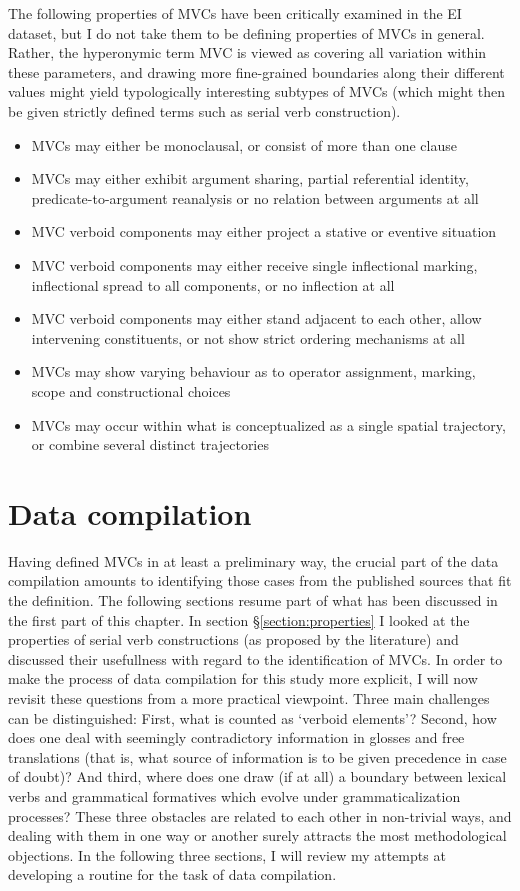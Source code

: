 The following properties of MVCs have been critically examined in the EI dataset, but I do not take them to be defining properties of MVCs in general. Rather, the hyperonymic term MVC is viewed as covering all variation within these parameters, and drawing more fine-grained boundaries along their different values might yield typologically interesting subtypes of MVCs (which might then be given strictly defined terms such as serial verb construction).


\begin{itemize}
\item MVCs may either be monoclausal, or consist of more than one clause
\item MVCs may either exhibit argument sharing, partial referential identity, predicate-to-argument reanalysis or no relation between arguments at all
\item MVC verboid components may either project a stative or eventive situation
\item MVC verboid components may either receive single inflectional marking, inflectional spread to all components, or no inflection at all
\item MVC verboid components may either stand adjacent to each other, allow intervening constituents, or not show strict ordering mechanisms at all
\item MVCs may show varying behaviour as to operator assignment, marking, scope and constructional choices
\item MVCs may occur within what is conceptualized as a single spatial trajectory, or combine several distinct trajectories 
\end{itemize}


\section{Data compilation}

Having defined MVCs in at least a preliminary way, the crucial part of the data compilation amounts to identifying those cases from the published sources that fit the definition. The following sections resume part of what has been discussed in the first part of this chapter. In section §\ref{section:properties} I looked at the properties of serial verb constructions (as proposed by the literature) and discussed their usefullness with regard to the identification of MVCs. In order to make the process of data compilation for this study more explicit, I will now revisit these questions from a more practical viewpoint.
Three main challenges can be distinguished: First, what is counted as `verboid elements'? Second, how does one deal with seemingly contradictory information in glosses and free translations (that is, what source of information is to be given precedence in case of doubt)? And third, where does one draw (if at all) a boundary between lexical verbs and grammatical formatives which evolve under grammaticalization processes? These three obstacles are related to each other in non-trivial ways, and dealing with them in one way or another surely attracts the most methodological objections. In the following three sections, I will review my attempts at developing a routine for the task of data compilation.

